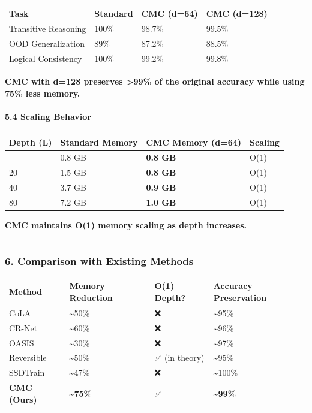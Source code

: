 \documentclass[
  11pt,
  a4paper,
]{article}
\begin{document}
\begin{longtable}[]{@{}llll@{}}
\toprule\noalign{}
Task & Standard & CMC (d=64) & CMC (d=128) \\
\midrule\noalign{}
\endhead
\bottomrule\noalign{}
\endlastfoot
Transitive Reasoning & 100\% & 98.7\% & 99.5\% \\
OOD Generalization & 89\% & 87.2\% & 88.5\% \\
Logical Consistency & 100\% & 99.2\% & 99.8\% \\
\end{longtable}

\textbf{CMC with d=128 preserves \textgreater99\% of the original
accuracy while using 75\% less memory.}

\paragraph{5.4 Scaling Behavior}\label{scaling-behavior}

\begin{longtable}[]{@{}llll@{}}
\toprule\noalign{}
Depth (L) & Standard Memory & CMC Memory (d=64) & Scaling \\
\midrule\noalign{}
\endhead
\bottomrule\noalign{}
\endlastfoot
10 & 0.8 GB & \textbf{0.8 GB} & O(1) \\
20 & 1.5 GB & \textbf{0.8 GB} & O(1) \\
40 & 3.7 GB & \textbf{0.9 GB} & O(1) \\
80 & 7.2 GB & \textbf{1.0 GB} & O(1) \\
\end{longtable}

\textbf{CMC maintains O(1) memory scaling as depth increases.}

\begin{center}\rule{0.5\linewidth}{0.5pt}\end{center}

\subsubsection{6. Comparison with Existing
Methods}\label{comparison-with-existing-methods}

\begin{longtable}[]{@{}llll@{}}
\toprule\noalign{}
Method & Memory Reduction & O(1) Depth? & Accuracy Preservation \\
\midrule\noalign{}
\endhead
\bottomrule\noalign{}
\endlastfoot
CoLA & \textasciitilde50\% & ❌ & \textasciitilde95\% \\
CR-Net & \textasciitilde60\% & ❌ & \textasciitilde96\% \\
OASIS & \textasciitilde30\% & ❌ & \textasciitilde97\% \\
Reversible & \textasciitilde50\% & ✅ (in theory) &
\textasciitilde95\% \\
SSDTrain & \textasciitilde47\% & ❌ & \textasciitilde100\% \\
\textbf{CMC (Ours)} & \textbf{\textasciitilde75\%} & ✅ &
\textbf{\textasciitilde99\%} \\
\end{longtable}
\end{document}
